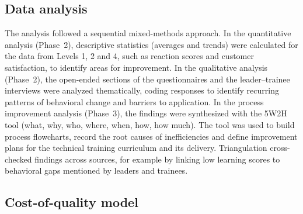 \subsection{Data analysis}
\label{subsec:analysis}

The analysis followed a sequential mixed-methods approach. In the quantitative analysis (Phase~2), descriptive statistics (averages and trends) were calculated for the data from Levels 1, 2 and 4, such as reaction scores and customer satisfaction, to identify areas for improvement. In the qualitative analysis (Phase~2), the open-ended sections of the questionnaires and the leader--trainee interviews were analyzed thematically, coding responses to identify recurring patterns of behavioral change and barriers to application. In the process improvement analysis (Phase~3), the findings were synthesized with the 5W2H tool (what, why, who, where, when, how, how much). The tool was used to build process flowcharts, record the root causes of inefficiencies and define improvement plans for the technical training curriculum and its delivery. Triangulation cross-checked findings across sources, for example by linking low learning scores to behavioral gaps mentioned by leaders and trainees. 

\subsection{Cost-of-quality model}
\label{subsec:coq-model}

